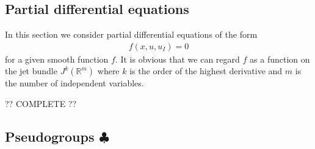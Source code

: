 \subsection{Partial differential equations}

    In this section we consider partial differential equations of the form
    \begin{gather}
        \label{diff:pde_jet}
        f(x,u,u_I) = 0
    \end{gather}
    for a given smooth function $f$. It is obvious that we can regard $f$ as a function on the jet bundle $J^k(\mathbb{R}^m)$ where $k$ is the order of the highest derivative and $m$ is the number of independent variables.


    ?? COMPLETE ??

\subsection{\texorpdfstring{Pseudogroups $\clubsuit$}{Pseudogroups}}

